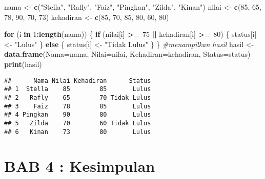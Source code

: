 \documentclass[
]{article}
\newenvironment{Shaded}{\begin{snugshade}}{\end{snugshade}}
\newcommand{\AttributeTok}[1]{\textcolor[rgb]{0.13,0.29,0.53}{#1}}
\newcommand{\CommentTok}[1]{\textcolor[rgb]{0.56,0.35,0.01}{\textit{#1}}}
\newcommand{\ControlFlowTok}[1]{\textcolor[rgb]{0.13,0.29,0.53}{\textbf{#1}}}
\newcommand{\DecValTok}[1]{\textcolor[rgb]{0.00,0.00,0.81}{#1}}
\newcommand{\FunctionTok}[1]{\textcolor[rgb]{0.13,0.29,0.53}{\textbf{#1}}}
\newcommand{\NormalTok}[1]{#1}
\newcommand{\OtherTok}[1]{\textcolor[rgb]{0.56,0.35,0.01}{#1}}
\newcommand{\SpecialCharTok}[1]{\textcolor[rgb]{0.81,0.36,0.00}{\textbf{#1}}}
\newcommand{\StringTok}[1]{\textcolor[rgb]{0.31,0.60,0.02}{#1}}
\begin{document}
\begin{Shaded}
\begin{Highlighting}[]
\NormalTok{nama }\OtherTok{\textless{}{-}} \FunctionTok{c}\NormalTok{(}\StringTok{"Stella"}\NormalTok{, }\StringTok{"Rafly"}\NormalTok{, }\StringTok{"Faiz"}\NormalTok{, }\StringTok{"Pingkan"}\NormalTok{, }\StringTok{"Zilda"}\NormalTok{, }\StringTok{"Kinan"}\NormalTok{)}
\NormalTok{nilai }\OtherTok{\textless{}{-}} \FunctionTok{c}\NormalTok{(}\DecValTok{85}\NormalTok{, }\DecValTok{65}\NormalTok{, }\DecValTok{78}\NormalTok{, }\DecValTok{90}\NormalTok{, }\DecValTok{70}\NormalTok{, }\DecValTok{73}\NormalTok{)}
\NormalTok{kehadiran }\OtherTok{\textless{}{-}} \FunctionTok{c}\NormalTok{(}\DecValTok{85}\NormalTok{, }\DecValTok{70}\NormalTok{, }\DecValTok{85}\NormalTok{, }\DecValTok{80}\NormalTok{, }\DecValTok{60}\NormalTok{, }\DecValTok{80}\NormalTok{)}

\ControlFlowTok{for}\NormalTok{ (i }\ControlFlowTok{in} \DecValTok{1}\SpecialCharTok{:}\FunctionTok{length}\NormalTok{(nama)) \{}
  \ControlFlowTok{if}\NormalTok{ (nilai[i] }\SpecialCharTok{\textgreater{}=} \DecValTok{75} \SpecialCharTok{||}\NormalTok{ kehadiran[i] }\SpecialCharTok{\textgreater{}=} \DecValTok{80}\NormalTok{) \{}
\NormalTok{    status[i] }\OtherTok{\textless{}{-}} \StringTok{"Lulus"}
\NormalTok{  \} }\ControlFlowTok{else}\NormalTok{ \{}
\NormalTok{    status[i] }\OtherTok{\textless{}{-}} \StringTok{"Tidak Lulus"}
\NormalTok{  \}}
\NormalTok{\}}
\CommentTok{\#menampilkan hasil }
\NormalTok{hasil }\OtherTok{\textless{}{-}} \FunctionTok{data.frame}\NormalTok{(}\AttributeTok{Nama=}\NormalTok{nama, }\AttributeTok{Nilai=}\NormalTok{nilai, }\AttributeTok{Kehadiran=}\NormalTok{kehadiran, }\AttributeTok{Status=}\NormalTok{status)}
\FunctionTok{print}\NormalTok{(hasil) }
\end{Highlighting}
\end{Shaded}

\begin{verbatim}
##      Nama Nilai Kehadiran      Status
## 1  Stella    85        85       Lulus
## 2   Rafly    65        70 Tidak Lulus
## 3    Faiz    78        85       Lulus
## 4 Pingkan    90        80       Lulus
## 5   Zilda    70        60 Tidak Lulus
## 6   Kinan    73        80       Lulus
\end{verbatim}

\section{BAB 4 : Kesimpulan}\label{bab-4-kesimpulan}
\end{document}
